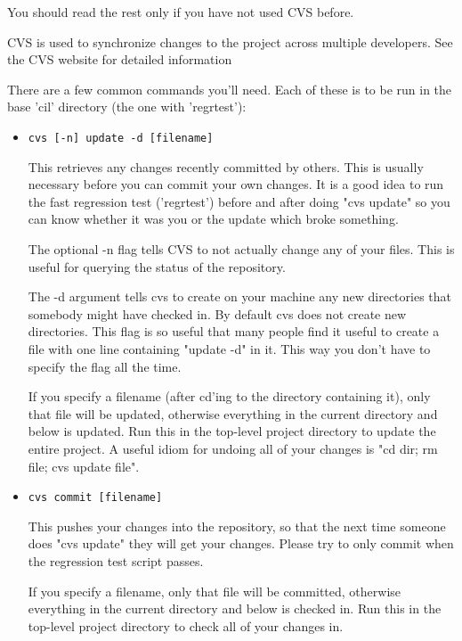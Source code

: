 \documentclass{article}
\def\t#1{{\tt #1}}
\begin{document}
\begin{enumerate}
 You should read the rest only if you have not used CVS before. 

 CVS is used to synchronize changes to the project across multiple
developers.  See the CVS website for detailed information

  
There are a few common commands you'll need.  Each of these is to be run
in the base 'cil' directory (the one with 'regrtest'):

\begin{itemize}
\item \t{cvs [-n] update -d [filename]}

    This retrieves any changes recently committed by others.  This is
    usually necessary before you can commit your own changes.  It is a
    good idea to run the fast regression test ('regrtest') before and
    after doing "cvs update" so you can know whether it was you or the
    update which broke something.

    The optional -n flag tells CVS to not actually change any of your
    files.  This is useful for querying the status of the repository.

    The -d argument tells cvs to create on your machine any new directories
    that somebody might have checked in. By default cvs does not create new
    directories. This flag is so useful that many people find it useful to
    create a  file with one line containing "update -d" in it.
    This way you don't have to specify the flag all the time.

    If you specify a filename (after cd'ing to the directory containing it),
    only that file will be updated, otherwise everything in the current
    directory and below is updated. Run this in the top-level project
    directory to update the entire project. A useful idiom for undoing all of
    your changes is "cd dir; rm file; cvs update file".

    
\item \t{cvs commit [filename]}

    This pushes your changes into the repository, so that the next time
    someone does "cvs update" they will get your changes.  Please try to
    only commit when the regression test script passes.
    
    If you specify a filename, only that file will be committed, otherwise
    everything in the current directory and below is checked in. Run this in
    the top-level project directory to check all of your changes in.


\end{itemize}
\end{enumerate}
\end{document}
